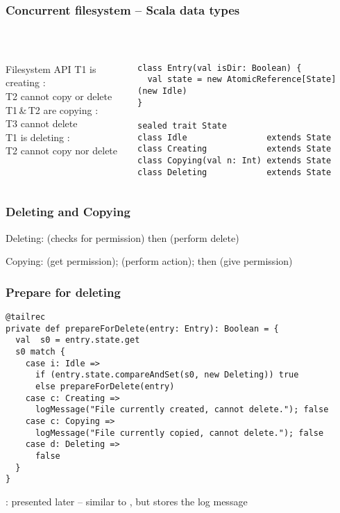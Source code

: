 \documentclass[aspectratio=169]{beamer}
\begin{document}
\begin{frame}[fragile]\frametitle{Concurrent filesystem -- Scala data types}
~\\[-8mm]
\begin{columns}
\begin{column}{0.35\textwidth}
    \begin{block}{Filesystem API}
      \alert{T1} is creating :
      \\\alert{T2} cannot copy or delete 
      \\[4mm]\alert{T1}\,\&\,\alert{T2} are copying :
      \\\alert{T3} cannot delete 
      \\[4mm]\alert{T1} is deleting :
      \\\alert{T2} cannot copy nor delete 
    \end{block}
\end{column}
\begin{column}{0.68\textwidth}
\begin{lstlisting}[emph={execute,sleep,log,compareAndSet,State,AtomicReference}]
class Entry(val isDir: Boolean) {
  val state = new AtomicReference[State](new Idle)
}

sealed trait State
class Idle                extends State
class Creating            extends State
class Copying(val n: Int) extends State
class Deleting            extends State
\end{lstlisting}
\end{column}
\end{columns}
\end{frame}


\begin{frame}[fragile]\frametitle{Deleting and Copying}
\alert{Deleting:} \textbf{} (checks for permission) then  (perform delete)

\alert{Copying:}  (get permission);  (perform action); then  (give permission)
\end{frame}


\begin{frame}[fragile]\frametitle{Prepare for deleting}

\begin{lstlisting}[emph={execute,sleep,log,logMessage,compareAndSet,State,AtomicReference,prepareForDelete}]
@tailrec
private def prepareForDelete(entry: Entry): Boolean = {
  val  s0 = entry.state.get
  s0 match {
    case i: Idle =>
      if (entry.state.compareAndSet(s0, new Deleting)) true
      else prepareForDelete(entry)
    case c: Creating =>
      logMessage("File currently created, cannot delete."); false
    case c: Copying =>
      logMessage("File currently copied, cannot delete."); false
    case d: Deleting =>
      false
  }
}
\end{lstlisting}

: presented later -- similar to , but stores the log message
\end{frame}
\end{document}
